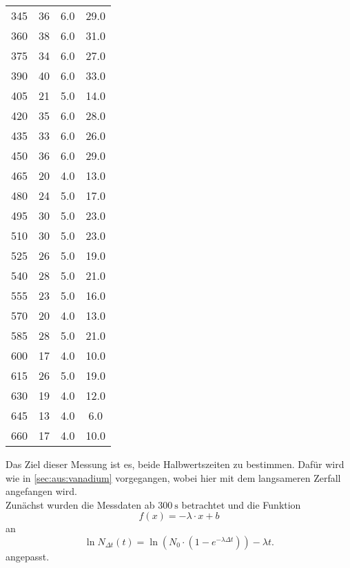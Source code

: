 \begin{longtable}{c c c c}
		345  	&  36  	&  6.0         	&  29.0 \\
		360  	&  38  	&  6.0         	&  31.0 \\
		375  	&  34  	&  6.0         	&  27.0 \\
		390  	&  40  	&  6.0         	&  33.0 \\
		405  	&  21  	&  5.0         	&  14.0 \\
		420  	&  35  	&  6.0         	&  28.0 \\
		435  	&  33  	&  6.0         	&  26.0 \\
		450  	&  36  	&  6.0         	&  29.0 \\
		465  	&  20  	&  4.0         	&  13.0 \\
		480  	&  24  	&  5.0         	&  17.0 \\
		495  	&  30  	&  5.0         	&  23.0 \\
		510  	&  30  	&  5.0         	&  23.0 \\
		525  	&  26  	&  5.0         	&  19.0 \\
		540  	&  28  	&  5.0         	&  21.0 \\
		555  	&  23  	&  5.0         	&  16.0 \\
		570  	&  20  	&  4.0         	&  13.0 \\
		585  	&  28  	&  5.0         	&  21.0 \\
		600  	&  17  	&  4.0         	&  10.0 \\
		615  	&  26  	&  5.0         	&  19.0 \\
		630  	&  19  	&  4.0         	&  12.0 \\
		645  	&  13  	&  4.0         	&   6.0 \\
		660  	&  17  	&  4.0         	&  10.0 \\
\end{longtable}
\noindent
Das Ziel dieser Messung ist es, beide Halbwertszeiten zu bestimmen. Dafür wird wie in \autoref{sec:aus:vanadium}
vorgegangen, wobei hier mit dem langsameren Zerfall angefangen wird.
\\
Zunächst wurden die Messdaten ab $\SI{300}{\second}$ betrachtet und die Funktion
\begin{equation}
	f(x) = -\lambda \cdot x + b
	\label{eqn:mx+b2}
\end{equation}
\noindent
an 
\begin{equation}
	\ln N_{\Delta t}(t) = \ln(N_0 \cdot (1 - e^{-\lambda \Delta t})) - \lambda t.
	\label{eqn:logarithmisch2}
\end{equation}
angepasst.
